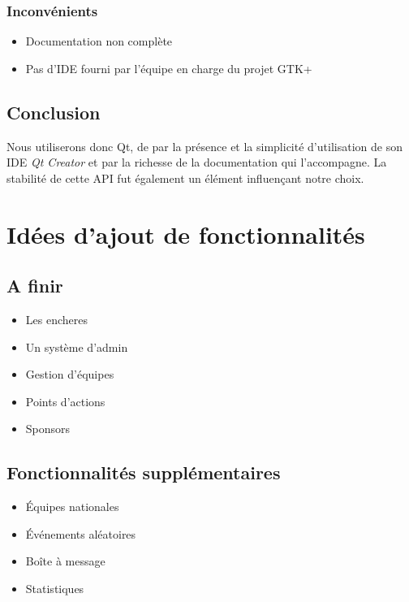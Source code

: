 \documentclass[a4paper]{report}
\begin{document}
\subsection{Inconvénients}
\begin{itemize}
    \item Documentation non complète
    \item Pas d'IDE fourni par l'équipe en charge du projet GTK+
\end{itemize}
\section{Conclusion}
Nous utiliserons donc Qt, de par la présence et la simplicité d'utilisation de son IDE \textit{Qt Creator} et par la richesse de la documentation qui l'accompagne. La stabilité de cette API fut également un élément influençant notre choix.

\chapter{Idées d'ajout de fonctionnalités}
\section{A finir}
\begin{itemize}
    \item Les \glspl{enchere}
    \item Un système d'admin
    \item Gestion d'équipes
    \item Points d'actions
    \item Sponsors
\end{itemize}
\section {Fonctionnalités supplémentaires}
\begin{itemize}
    \item Équipes nationales
    \item Événements aléatoires
    \item Boîte à message
    \item Statistiques
\end{itemize}



\printindex
\listoffigures
\end{document}
